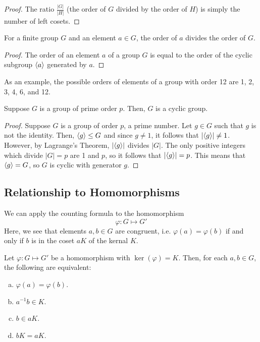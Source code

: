 \documentclass[letterpaper]{article}
\begin{document}
\begin{mdframed}
    \begin{proof}
        The ratio $\frac{|G|}{|H|}$ (the order of $G$ divided by the order of $H$) is simply the number of left cosets. 
    \end{proof}
\end{mdframed}

\begin{corollary}{}{}
    For a finite group $G$ and an element $a \in G$, the order of $a$ divides the order of $G$.
\end{corollary}

\begin{mdframed}
    \begin{proof}
        The order of an element $a$ of a group $G$ is equal to the order of the cyclic subgroup $\langle a \rangle$ generated by $a$. 
    \end{proof}
\end{mdframed}
As an example, the possible orders of elements of a group with order 12 are 1, 2, 3, 4, 6, and 12. 

\begin{corollary}{}{}
    Suppose $G$ is a group of prime order $p$. Then, $G$ is a cyclic group. 
\end{corollary}

\begin{mdframed}
    \begin{proof}
        Suppose $G$ is a group of order $p$, a prime number. Let $g \in G$ such that $g$ is not the identity. Then, $\langle g \rangle \leq G$ and since $g \neq 1$, it follows that $|\langle g \rangle| \neq 1$. However, by Lagrange's Theorem, $|\langle g \rangle|$ divides $|G|$. The only positive integers which divide $|G| = p$ are 1 and $p$, so it follows that $|\langle g \rangle| = p$. This means that $\langle g \rangle = G$, so $G$ is cyclic with generator $g$.  
    \end{proof}
\end{mdframed}

\subsection{Relationship to Homomorphisms}
We can apply the counting formula to the homomorphism
\[\varphi: G \mapsto G'\]
Here, we see that elements $a, b \in G$ are congruent, i.e. $\varphi(a) = \varphi(b)$ if and only if $b$ is in the coset $aK$ of the kernal $K$.
\begin{mdframed}
    \begin{proposition}
        Let $\varphi: G \mapsto G'$ be a homomorphism with $\ker(\varphi) = K$. Then, for each $a, b \in G$, the following are equivalent: 
        \begin{enumerate}[(a)]
            \item $\varphi(a) = \varphi(b)$. 
            \item $a^{-1}b \in K$.
            \item $b \in aK$. 
            \item $bK = aK$. 
        \end{enumerate}
    \end{proposition}
\end{mdframed}
\end{document}
